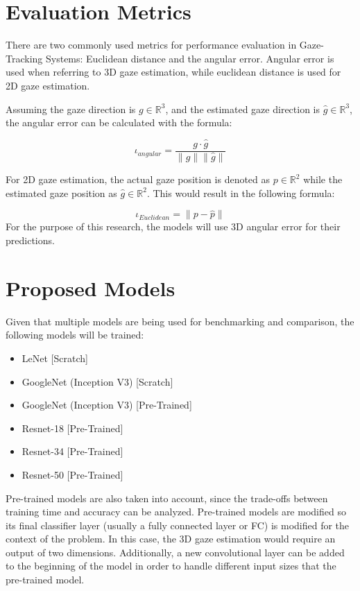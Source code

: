 \section{Evaluation Metrics}
\label{EvaluationMetrics}
There are two commonly used metrics for performance evaluation in Gaze-Tracking Systems:
Euclidean distance and the angular error. Angular error is used when referring to 3D gaze estimation, while euclidean distance is used for 2D gaze estimation.

Assuming the gaze direction is \boldmath $g \in \mathbb{R}^3$, and the estimated gaze direction is
\boldmath $\hat{g}  \in \mathbb{R}^3$, the angular error can be calculated with the formula:

\begin{equation} \iota _{angular} = \frac{g \cdot  \hat{g} }{ \|g\|\|\hat{g}\| } \end{equation}

For 2D gaze estimation, the actual gaze position is denoted as 
\boldmath $p \in \mathbb{R}^2$ while the estimated gaze position as
\boldmath $\hat{g} \in \mathbb{R}^2$. This would result in the following formula:

\begin{equation} \iota _{Euclidean} = \| p - \hat{p} \|  \end{equation}
For the purpose of this research, the models will use 3D angular error for their predictions.

\section{Proposed Models}
\label{proposed-models}
Given that multiple models are being used for benchmarking and comparison, the following models will be trained:

\begin{itemize}
    \item LeNet [Scratch]
    \item GoogleNet (Inception V3) [Scratch]
    \item GoogleNet (Inception V3) [Pre-Trained]
    \item Resnet-18 [Pre-Trained]
    \item Resnet-34 [Pre-Trained]
    \item Resnet-50 [Pre-Trained]
\end{itemize}
Pre-trained models are also taken into account, since the trade-offs between
training time and accuracy can be analyzed. Pre-trained models are modified so its final classifier layer (usually a fully connected layer or FC) 
is modified for the context of the problem. In this case, the 3D gaze estimation would require an output of two dimensions. Additionally, 
a new convolutional layer can be added to the beginning of the model in order to handle different input sizes that the pre-trained model.

